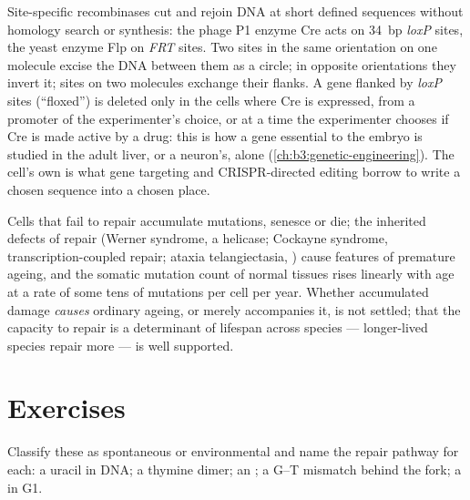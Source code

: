 \begin{proposition}\label{prop:b3:dna-repair:tools}
Site-specific recombinases cut and rejoin DNA at short defined
sequences without homology search or synthesis: the phage P1 enzyme
Cre acts on \qty{34}{bp} \emph{loxP} sites, the yeast enzyme Flp on
\emph{FRT} sites. Two sites in the same orientation on one molecule
excise the DNA between them as a circle; in opposite orientations they
invert it; sites on two molecules exchange their flanks. A gene
flanked by \emph{loxP} sites (``floxed'') is deleted only in the cells
where Cre is expressed, from a promoter of the experimenter's choice,
or at a time the experimenter chooses if Cre is made active by a drug:
this is how a gene essential to the embryo is studied in the adult
liver, or a neuron's, alone (\cref{ch:b3:genetic-engineering}). The
cell's own  is what gene targeting and
CRISPR-directed editing borrow to write a chosen sequence into a
chosen place.
\end{proposition}

\begin{remark}\label{rem:b3:dna-repair:ageing}
Cells that fail to repair accumulate mutations, senesce or die; the
inherited defects of repair (Werner syndrome, a helicase; Cockayne
syndrome, transcription-coupled repair; ataxia telangiectasia, )
cause features of premature ageing, and the somatic mutation count of
normal tissues rises linearly with age at a rate of some tens of
mutations per cell per year. Whether accumulated damage \emph{causes}
ordinary ageing, or merely accompanies it, is not settled; that the
capacity to repair is a determinant of lifespan across species ---
longer-lived species repair more --- is well supported.
\end{remark}

\section{Exercises}

\begin{exercise}[$\star$]\label{exo:b3:dna-repair:1}
Classify these  as spontaneous or environmental and name the
repair pathway for each: a uracil in DNA; a thymine dimer; an
; a G--T mismatch behind the fork; a 
in G1.
\end{exercise}

